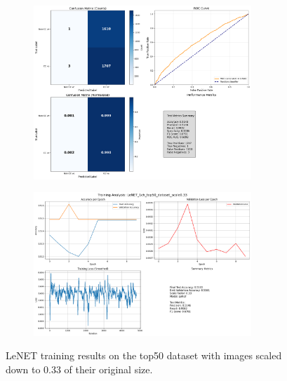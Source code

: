 \documentclass{pracalicmgr}
\begin{document}
\newpage

\begin{figure}[H]
    \centering
    \begin{subfigure}{\textwidth}
        \centering
        \includegraphics[width=0.9\textwidth]{src/LeNET_1ch_top50_dataset_scale033.png}
        \label{fig:Letop5033sub1}
    \end{subfigure}
    
    \vspace{1cm}
    
    \begin{subfigure}{\textwidth}
        \centering
        \includegraphics[width=0.9\textwidth]{src/LeNET_1ch_top50_dataset_scale033loss.png}
        \label{fig:Letop5033sub2}
    \end{subfigure}
    \caption{LeNET training results on the top50 dataset with images scaled down to 0.33 of their original size.}
    \label{fig:Letop5033stacked}
\end{figure}
\end{document}
